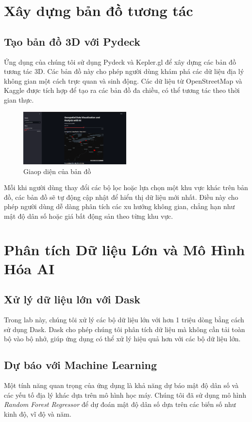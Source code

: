 \documentclass[a4paper,12pt]{report}
\begin{document}
\section{Xây dựng bản đồ tương tác}
\subsection{Tạo bản đồ 3D với Pydeck}
Ứng dụng của chúng tôi sử dụng Pydeck và Kepler.gl để xây dựng các bản đồ tương tác 3D. Các bản đồ này cho phép người dùng khám phá các dữ liệu địa lý không gian một cách trực quan và sinh động. Các dữ liệu từ OpenStreetMap và Kaggle được tích hợp để tạo ra các bản đồ đa chiều, có thể tương tác theo thời gian thực.

\begin{figure}[h]
    \centering
    \includegraphics[width=0.5\textwidth]{image/geo_ui.png}
    \caption{Giaop diện của bản đồ}
    \label{fig:geo}
\end{figure}

Mỗi khi người dùng thay đổi các bộ lọc hoặc lựa chọn một khu vực khác trên bản đồ, các bản đồ sẽ tự động cập nhật để hiển thị dữ liệu mới nhất. Điều này cho phép người dùng dễ dàng phân tích các xu hướng không gian, chẳng hạn như mật độ dân số hoặc giá bất động sản theo từng khu vực.

\section{Phân tích Dữ liệu Lớn và Mô Hình Hóa AI}
\subsection{Xử lý dữ liệu lớn với Dask}
Trong lab này, chúng tôi xử lý các bộ dữ liệu lớn với hơn 1 triệu dòng bằng cách sử dụng Dask. Dask cho phép chúng tôi phân tích dữ liệu mà không cần tải toàn bộ vào bộ nhớ, giúp ứng dụng có thể xử lý hiệu quả hơn với các bộ dữ liệu lớn.

\subsection{Dự báo với Machine Learning}
Một tính năng quan trọng của ứng dụng là khả năng dự báo mật độ dân số và các yếu tố địa lý khác dựa trên mô hình học máy. Chúng tôi đã sử dụng mô hình \textit{Random Forest Regressor} để dự đoán mật độ dân số dựa trên các biến số như kinh độ, vĩ độ và năm.
\end{document}
